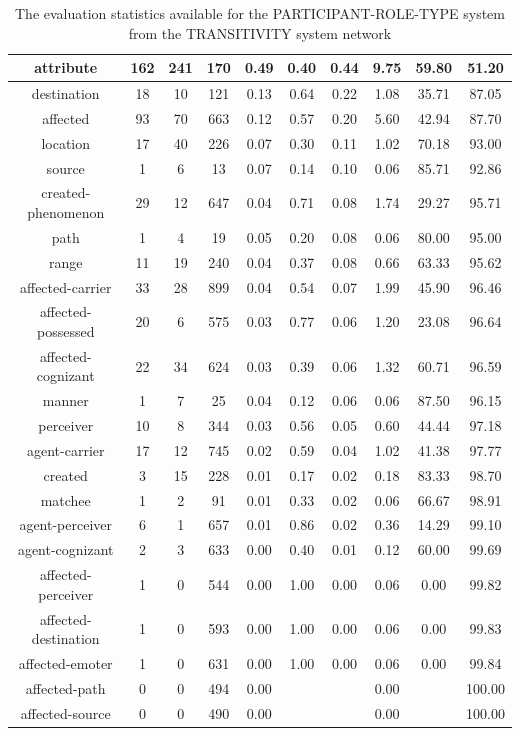 \begin{table}[!ht]
{\begin{tabular}{|c|c|c|c|c|c|c|c|c|c|}
        attribute & 162 & 241 & 170 & 0.49 & 0.40 & 0.44 & 9.75 & 59.80 & 51.20 \\ \hline
        destination & 18 & 10 & 121 & 0.13 & 0.64 & 0.22 & 1.08 & 35.71 & 87.05 \\ \hline
        affected & 93 & 70 & 663 & 0.12 & 0.57 & 0.20 & 5.60 & 42.94 & 87.70 \\ \hline
        location & 17 & 40 & 226 & 0.07 & 0.30 & 0.11 & 1.02 & 70.18 & 93.00 \\ \hline
        source & 1 & 6 & 13 & 0.07 & 0.14 & 0.10 & 0.06 & 85.71 & 92.86 \\ \hline
        created-phenomenon & 29 & 12 & 647 & 0.04 & 0.71 & 0.08 & 1.74 & 29.27 & 95.71 \\ \hline
        path & 1 & 4 & 19 & 0.05 & 0.20 & 0.08 & 0.06 & 80.00 & 95.00 \\ \hline
        range & 11 & 19 & 240 & 0.04 & 0.37 & 0.08 & 0.66 & 63.33 & 95.62 \\ \hline
        affected-carrier & 33 & 28 & 899 & 0.04 & 0.54 & 0.07 & 1.99 & 45.90 & 96.46 \\ \hline
        affected-possessed & 20 & 6 & 575 & 0.03 & 0.77 & 0.06 & 1.20 & 23.08 & 96.64 \\ \hline
        affected-cognizant & 22 & 34 & 624 & 0.03 & 0.39 & 0.06 & 1.32 & 60.71 & 96.59 \\ \hline
        manner & 1 & 7 & 25 & 0.04 & 0.12 & 0.06 & 0.06 & 87.50 & 96.15 \\ \hline
        perceiver & 10 & 8 & 344 & 0.03 & 0.56 & 0.05 & 0.60 & 44.44 & 97.18 \\ \hline
        agent-carrier & 17 & 12 & 745 & 0.02 & 0.59 & 0.04 & 1.02 & 41.38 & 97.77 \\ \hline
        created & 3 & 15 & 228 & 0.01 & 0.17 & 0.02 & 0.18 & 83.33 & 98.70 \\ \hline
        matchee & 1 & 2 & 91 & 0.01 & 0.33 & 0.02 & 0.06 & 66.67 & 98.91 \\ \hline
        agent-perceiver & 6 & 1 & 657 & 0.01 & 0.86 & 0.02 & 0.36 & 14.29 & 99.10 \\ \hline
        agent-cognizant & 2 & 3 & 633 & 0.00 & 0.40 & 0.01 & 0.12 & 60.00 & 99.69 \\ \hline
        affected-perceiver & 1 & 0 & 544 & 0.00 & 1.00 & 0.00 & 0.06 & 0.00 & 99.82 \\ \hline
        affected-destination & 1 & 0 & 593 & 0.00 & 1.00 & 0.00 & 0.06 & 0.00 & 99.83 \\ \hline
        affected-emoter & 1 & 0 & 631 & 0.00 & 1.00 & 0.00 & 0.06 & 0.00 & 99.84 \\ \hline
        affected-path & 0 & 0 & 494 & 0.00 &  &  & 0.00 &  & 100.00 \\ \hline
        affected-source & 0 & 0 & 490 & 0.00 &  &  & 0.00 &  & 100.00 \\ \hline
    \end{tabular}
}
\caption{The evaluation statistics available for the PARTICIPANT-ROLE-TYPE system from the TRANSITIVITY system network}
\label{tab:features-participant-role}
\end{table}
